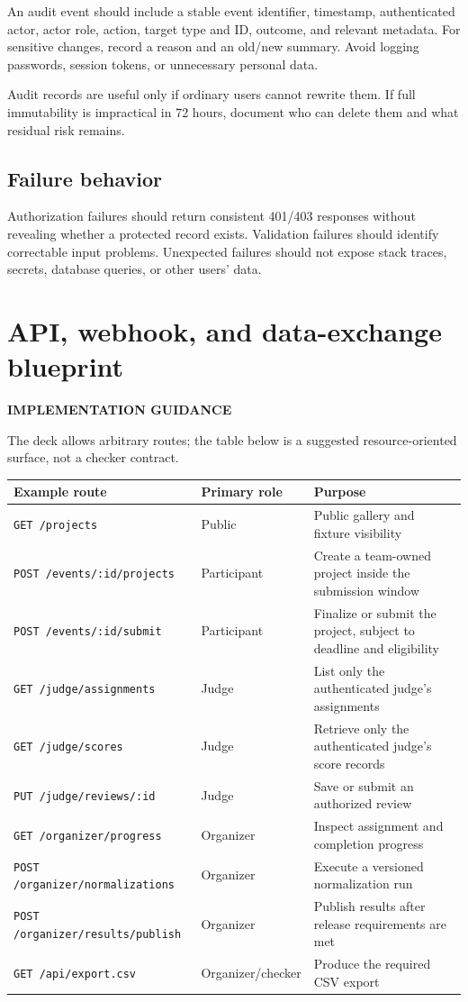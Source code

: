 \documentclass[11pt]{article}
\newcommand{\advisory}{\textcolor{DeepBlue}{\textbf{IMPLEMENTATION GUIDANCE}}}
\begin{document}
An audit event should include a stable event identifier, timestamp, authenticated actor, actor role, action, target type and ID, outcome, and relevant metadata. For sensitive changes, record a reason and an old/new summary. Avoid logging passwords, session tokens, or unnecessary personal data.

Audit records are useful only if ordinary users cannot rewrite them. If full immutability is impractical in 72 hours, document who can delete them and what residual risk remains.

\subsection{Failure behavior}

Authorization failures should return consistent 401/403 responses without revealing whether a protected record exists. Validation failures should identify correctable input problems. Unexpected failures should not expose stack traces, secrets, database queries, or other users' data.

\section{API, webhook, and data-exchange blueprint}

\advisory\par


The deck allows arbitrary routes; the table below is a suggested resource-oriented surface, not a checker contract.

\begin{longtable}{@{}L{54mm}L{31mm}L{73mm}@{}}
\toprule
\textbf{Example route} & \textbf{Primary role} & \textbf{Purpose}\\
\midrule
\endhead%
\texttt{GET /projects} & Public & Public gallery and fixture visibility\\
\texttt{POST /events/:id/projects} & Participant & Create a team-owned project inside the submission window\\
\texttt{POST /events/:id/submit} & Participant & Finalize or submit the project, subject to deadline and eligibility\\
\texttt{GET /judge/assignments} & Judge & List only the authenticated judge's assignments\\
\texttt{GET /judge/scores} & Judge & Retrieve only the authenticated judge's score records\\
\texttt{PUT /judge/reviews/:id} & Judge & Save or submit an authorized review\\
\texttt{GET /organizer/progress} & Organizer & Inspect assignment and completion progress\\
\texttt{POST /organizer/normalizations} & Organizer & Execute a versioned normalization run\\
\texttt{POST /organizer/results/publish} & Organizer & Publish results after release requirements are met\\
\texttt{GET /api/export.csv} & Organizer/checker & Produce the required CSV export\\
\bottomrule
\end{longtable}
\end{document}
